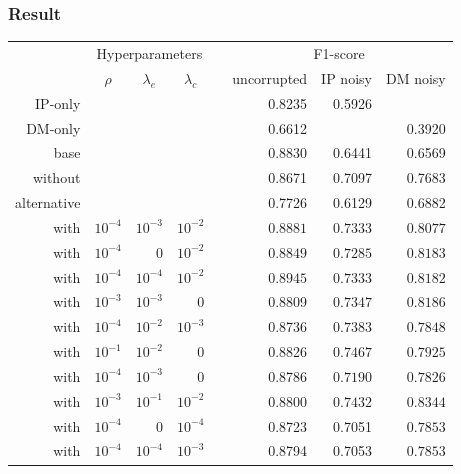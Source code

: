 \documentclass[10pt]{beamer}
\begin{document}
\begin{frame}
\frametitle{Result}
\centering
\begin{tabular}{@{}rrrrcrrr@{}}\toprule
& \multicolumn{3}{c}{Hyperparameters} & \phantom{abc}& \multicolumn{3}{c}{F1-score}\\
\cmidrule{2-4} \cmidrule{6-8}
& \multicolumn{1}{c}{$\rho$} & \multicolumn{1}{c}{$\lambda_e$} & \multicolumn{1}{c}{$\lambda_c$} && \multicolumn{1}{r}{uncorrupted} & \multicolumn{1}{r}{IP noisy} & \multicolumn{1}{r}{DM noisy}\\ \midrule\midrule
IP-only & & & && 0.8235 & 0.5926 & \\
DM-only & & & && 0.6612 &  & 0.3920\\\midrule
base & & & && 0.8830 & 0.6441 & 0.6569\\
without & & & && 0.8671& 0.7097& 0.7683\\
alternative & & & && 0.7726 & 0.6129 & 0.6882\\\midrule
with & $10^{-4}$ & $10^{-3}$ & $10^{-2}$ && $\mathbf{0.8881}$& $\mathbf{0.7333}$& $\mathbf{0.8077}$\\
with & $10^{-4}$ & $0$ & $10^{-2}$ && $\mathbf{0.8849}$& $\mathbf{0.7285}$& $\mathbf{0.8183}$\\
with & $10^{-4}$ & $10^{-4}$ & $10^{-2}$ && $\mathbf{0.8945}$& $\mathbf{0.7333}$& $\mathbf{0.8182}$\\
with & $10^{-3}$ & $10^{-3}$ & $0$ && 0.8809& $\mathbf{0.7347}$& $\mathbf{0.8186}$\\
with & $10^{-4}$ & $10^{-2}$ & $10^{-3}$ && 0.8736& $\mathbf{0.7383}$& $\mathbf{0.7848}$\\
with & $10^{-1}$ & $10^{-2}$ & $0$ && 0.8826& $\mathbf{0.7467}$& $\mathbf{0.7925}$\\
with & $10^{-4}$ & $10^{-3}$ & $0$ && 0.8786& $\mathbf{0.7190}$& $\mathbf{0.7826}$\\
with & $10^{-3}$ & $10^{-1}$ & $10^{-2}$ && 0.8800& $\mathbf{0.7432}$& $\mathbf{0.8344}$\\
with & $10^{-4}$ & $0$ & $10^{-4}$ && 0.8723& 0.7051& $\mathbf{0.7853}$\\
with & $10^{-4}$ & $10^{-4}$ & $10^{-3}$ && 0.8794& 0.7053& $\mathbf{0.7853}$\\
\bottomrule
\end{tabular}
\end{frame}
\end{document}
